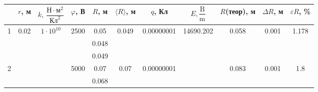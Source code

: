 \documentclass[a4paper,12pt]{article}
\begin{document}
\newpage
	\begin{table}[h!]
		\begin{tabular}{|c|c|c|c|c|c|c|c|c|c|c|}
			\hline
			& $r$, м                 & $k,\>\dfrac{\textrm{Н}\cdot\textrm{м}^2}{\textrm{Кл}^2}$ & $\varphi$,  В          & $R$, м & $\langle R\rangle$, м  & $q$, Кл                     & $E, \dfrac{\textrm{B}}{\textrm{m}}$ & $R$(теор), м          & $\Delta R$, м          & $\varepsilon R$,  \%   \\ \hline
			\multirow{3}{*}{1} & \multirow{18}{*}{0.02} & \multirow{18}{*}{$1\cdot10^{10}$}                            & \multirow{3}{*}{2500}  & 0.05   & \multirow{3}{*}{0.049} & \multirow{3}{*}{0.00000001} & \multirow{18}{*}{14690.202}     & \multirow{3}{*}{0.058} & \multirow{3}{*}{0.001} & \multirow{3}{*}{1.178} \\ \cline{5-5}
			&                        &                                                          &                        & 0.048  &                        &                             &                                 &                        &                        &                        \\ \cline{5-5}
			&                        &                                                          &                        & 0.049  &                        &                             &                                 &                        &                        &                        \\ \cline{1-1} \cline{4-7} \cline{9-11} 
			\multirow{3}{*}{2} &                        &                                                          & \multirow{3}{*}{5000}  & 0.07   & \multirow{3}{*}{0.07}  & \multirow{3}{*}{0.00000001} &                                 & \multirow{3}{*}{0.083} & \multirow{3}{*}{0.001} & \multirow{3}{*}{1.8}   \\ \cline{5-5}
			&                        &                                                          &                        & 0.068  &                        &                             &                                 &                        &                        &                        \\ \cline{5-5}

\end{tabular}
\end{table}
\end{document}
